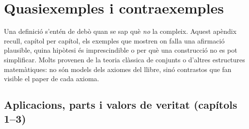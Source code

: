 \chapter{Quasiexemples i contraexemples}\label{cap:contraexemples}

Una definició s'entén de debò quan se sap què \emph{no} la compleix. Aquest
apèndix recull, capítol per capítol, els exemples que mostren on falla una
afirmació plausible, quina hipòtesi és imprescindible o per què una
construcció no es pot simplificar. Molts provenen de la teoria clàssica de
conjunts o d'altres estructures matemàtiques: no són models dels axiomes del
llibre, sinó contrastos que fan visible el paper de cada axioma.

\section*{Aplicacions, parts i valors de veritat (capítols 1--3)}

